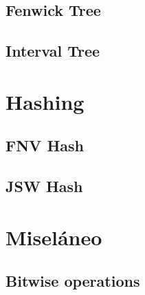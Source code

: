 \documentclass[10pt,letterpaper,twocolumn,twosided]{article}
\begin{document}
\subsection{Fenwick Tree}

\subsection{Interval Tree}

\section{Hashing} %

\subsection{FNV Hash}

\subsection{JSW Hash}

\section{Miseláneo}

\subsection {Bitwise operations}
\end{document}
